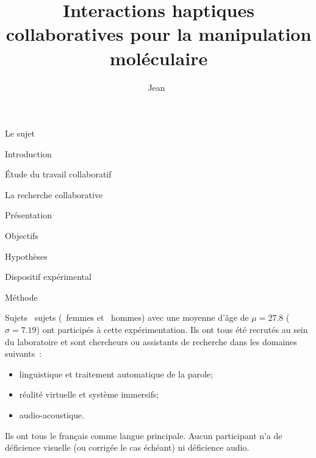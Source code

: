 \documentclass[myfrancais]{mythesis}
\title{Interactions haptiques collaboratives pour la manipulation moléculaire}
\author{Jean~\name{Simard}}
\date{\mydate[datestyle=long]{01/12/2011}}
\newcommand{\mynum}[1]{\nombre{#1}}
\begin{document}
	\frontmatter
	\maketitle
	\mytoc
	\mylof
	\mylot
	\mylotodo
	\mainmatter
	\begin{mypart}{Le sujet}
		\begin{mychapter}{Introduction}
		\end{mychapter}
	\end{mypart}
	\begin{mypart}{Étude du travail collaboratif}
		\begin{mychapter}{La recherche collaborative}
			\begin{mysection}{Présentation}
				\begin{mysubsection}{Objectifs}
				\end{mysubsection}
				\begin{mysubsection}{Hypothèses}
				\end{mysubsection}
			\end{mysection}
			\begin{mysection}{Dispositif expérimental}
			\end{mysection}
			\begin{mysection}{Méthode}
				\begin{mysubsection}{Sujets}
					\mynum{24}~sujets (\mynum{4}~femmes et \mynum{20}~hommes) avec une moyenne d'âge de $\mu = 27.8$ ($\sigma = 7.19$) ont participés à cette expérimentation.
					Ils ont tous été recrutés au sein du laboratoire  et sont chercheurs ou assistants de recherche dans les domaines suivants~:
					\begin{itemize}
						\item linguistique et traitement automatique de la parole;
						\item réalité virtuelle et système immersifs;
						\item audio-acoustique.
					\end{itemize}
					Ils ont tous le français comme langue principale.
					Aucun participant n'a de déficience visuelle (ou corrigée le cas échéant) ni déficience audio.


\end{mysubsection}
\end{mysection}
\end{mychapter}
\end{mypart}
\end{document}
